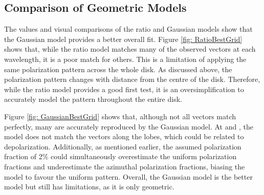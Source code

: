 \subsection{Comparison of Geometric Models}
The \chired values and visual comparisons of the ratio and Gaussian models show that the Gaussian model provides a better overall fit. Figure \ref{fig: RatioBestGrid} shows that, while the ratio model matches many of the observed vectors at each wavelength, it is a poor match for others. This is a limitation of applying the same polarization pattern across the whole disk. As discussed above, the polarization pattern changes with distance from the centre of the disk. Therefore, while the ratio model provides a good first test, it is an oversimplification to accurately model the pattern throughout the entire disk. 


Figure \ref{fig: GaussianBestGrid} shows that, although not all vectors match perfectly, many are accurately reproduced by the Gaussian model. At \bsix and \bsevenNS, the model does not match the vectors along the lobes, which could be related to depolarization. Additionally, as mentioned earlier, the assumed polarization fraction of 2\% could simultaneously overestimate the uniform polarization fractions and underestimate the azimuthal polarization fractions, biasing the model to favour the uniform pattern. Overall, the Gaussian model is the better model but still has limitations, as it is only geometric. 
